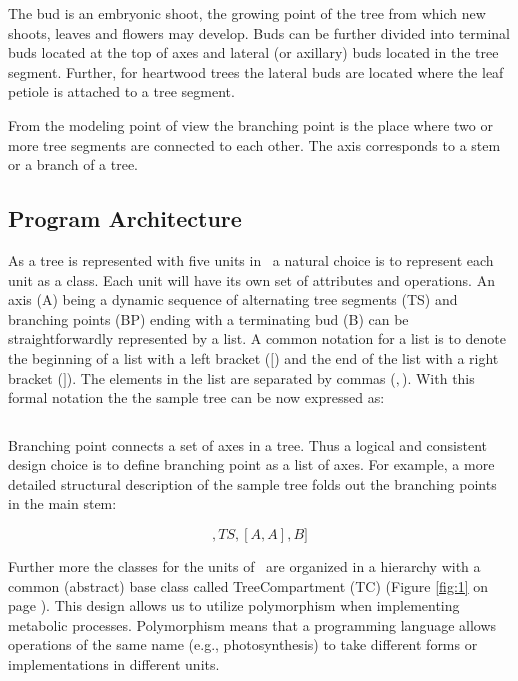 The bud is  an  embryonic shoot, the  growing  point of the tree  from
which new shoots, leaves and flowers may develop.  Buds can be further
divided  into terminal buds located at  the top of  axes and lateral
(or   axillary) buds  located   in the  tree   segment.  Further,  for
heartwood trees the lateral buds are located where the leaf petiole is
attached to a tree segment.

From the modeling point of view the branching point is the place where
two or more  tree  segments are  connected  to each other.   The  axis
corresponds to a stem or a branch of a tree.

\subsection{Program Architecture}

As a tree is represented with five units in  \lignum\ a natural choice
is to represent each unit as a class.  Each unit will have its own set
of attributes and operations.  An axis (A) being a dynamic sequence of
alternating tree segments (TS) and branching points (BP) ending with a
terminating bud (B) can be straightforwardly represented by a list.  A
common notation for a list is to denote the beginning of a list with a
left bracket ($[$)   and the  end of  the  list with  a right  bracket
($]$). The elements in the  list are separated  by commas ($,$).  With
this formal notation the the sample tree can be now expressed as:

\begin{displaymath}
[TS,BP,TS,BP,B]
\end{displaymath}

Branching  point connects a  set of axes  in a tree.  Thus a logical
and consistent design choice is to define branching point as a list of
axes. For   example, a more  detailed structural  description of the
sample tree folds out the branching points in the main stem:

\begin{displaymath}
[TS,[A,A],TS,[A,A],B]
\end{displaymath}
 
Further more the classes for the  units of \lignum\ are organized in a
hierarchy with  a common (abstract) base  class called TreeCompartment
(TC) (Figure \ref{fig:1} on page \pageref{fig:1}).  This design allows
us  to  utilize polymorphism  when  implementing metabolic  processes.
Polymorphism means  that a  programming language allows  operations of
the  same  name (e.g.,  photosynthesis)  to  take  different forms  or
implementations in different units.


